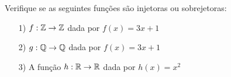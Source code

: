 \documentclass{beamer}
\begin{document}
    \begin{frame}
        \begin{exemplos}
            Verifique se as seguintes fun\c{c}\~oes s\~ao injetoras ou sobrejetoras:
            \begin{enumerate}
                \item[1)] $f : \mathbb{Z} \to \mathbb{Z}$ dada por $f(x) = 3x + 1$
            \end{enumerate}
        \end{exemplos}

        \vspace{5cm}
    \end{frame}

    \begin{frame}
        \vspace{5cm}
    \end{frame}

    \begin{frame}
        \begin{exemplos}
            \begin{enumerate}
                \item[2)] $g : \mathbb{Q} \to \mathbb{Q}$ dada por $f(x) = 3x + 1$
            \end{enumerate}
        \end{exemplos}

        \vspace{5cm}
    \end{frame}

    \begin{frame}
        \vspace{5cm}
    \end{frame}

    \begin{frame}
        \begin{exemplos}
            \begin{enumerate}
                \item[3)] A fun\c{c}\~ao $h :\mathbb{R} \to \mathbb{R}$ dada por $h(x) = x^2$
            \end{enumerate}
        \end{exemplos}

        \vspace{5cm}
    \end{frame}

    \begin{frame}
        \vspace{5cm}
    \end{frame}
\end{document}
